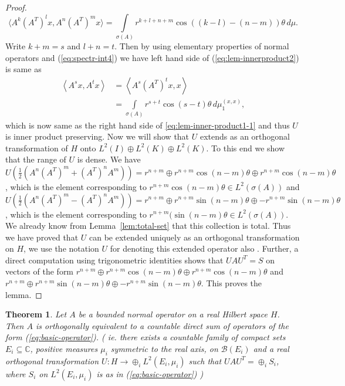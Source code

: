 \documentclass[12pt,a4paper,twoside]{article}
\numberwithin{equation}{section}
\theoremstyle{definition}  %
\theoremstyle{plain}  %
\newtheorem{thm}[defn]{Theorem}
\theoremstyle{remark} %
\begin{document}
\begin{proof}
\begin{equation} \label{eq:lem-innerproduct2}
  \langle A^k{(A^T)}^lx,A^n{(A^T)}^mx \rangle =  \int \limits_{\sigma(A)} \!\!r^{k+l+n+m}\cos((k-l)-(n-m))\theta  \,d\mu .
\end{equation}
Write $k+m=s$ and $l+n=t$. Then by using elementary properties of normal operators and (\ref{eq:spectr-int4}) we have left hand side of (\ref{eq:lem-innerproduct2}) is same as
\begin{align*}
  \left\langle A^{s}x,A^{t}x   \right\rangle &= \left\langle A^{s}{(A^T)}^{t}x, x   \right\rangle\\
& = \int \limits_{\sigma(A)}\! r^{s+t}\cos (s-t)\theta \, d\mu_{1}^{(x,x)},
\end{align*}
which is now same as the right hand side of \ref{eq:lem-inner-product1-1} and thus $U$ is inner product preserving. Now we will show that $U$ extends as an orthogonal transformation of $H$ onto $L^{2}(I) \oplus L^{2}(K) \oplus L^{2}(K)$. To this end we show that the range of $U$ is dense.%
 We have $U(\frac{1}{2}(A^{n}{(A^T)}^{m}+{(A^T)}^{n}A^{m})) = r^{n+m} \oplus r^{n+m}\cos(n-m)\theta  \oplus r^{n+m}\cos(n-m)\theta$, which is the element corresponding to $r^{n+m}\cos(n-m)\theta \in L^{2}(\sigma(A))$ and $U(\frac{1}{2}(A^{n}{(A^T)}^{m}-{(A^{T})}^{n}A^{m})) = r^{n+m} \oplus r^{n+m}\sin(n-m)\theta  \oplus -r^{n+m}\sin(n-m)\theta$,  which is the element corresponding to $r^{n+m}(\sin(n-m)\theta \in L^{2}(\sigma(A))$. We already know from Lemma~\ref{lem:total-set} that this collection is total. Thus we have proved that $U$ can be extended uniquely as an orthogonal transformation on $H$, we use the notation $U$ for denoting this extended operator also . Further, a direct computation using trigonometric identities shows that $U A U^{T} = S$ on vectors of the form $r^{n+m} \oplus r^{n+m}\cos(n-m)\theta  \oplus r^{n+m}\cos(n-m)\theta$ and $r^{n+m} \oplus r^{n+m}\sin(n-m)\theta  \oplus -r^{n+m}\sin(n-m)\theta$. This proves the lemma.
\end{proof}

\begin{thm}\label{thm:spectr-theor-real}
Let $A$ be a bounded normal operator on a real Hilbert space $H$.
Then $A$ is orthogonally equivalent to a countable direct sum of
operators of the form  (\ref{eq:basic-operator}). ( \emph{ie. }there
exists a countable family of  compact sets $E_i \subseteq
\mathbb{C}$, positive measures $\mu_i$ symmetric to the real axis,
on $\mathcal{B}(E_i)$ and a real orthogonal transformation $U \colon
H \rightarrow \oplus_{i}  L^{2}(E_{i},\mu_{i})$ such that
$UAU^{T} = \oplus_i{S_i}$, where $S_{i}$ on $L^2(E_{i},\mu_i) $ is
as in (\ref{eq:basic-operator}) )
\end{thm}
\end{document}
